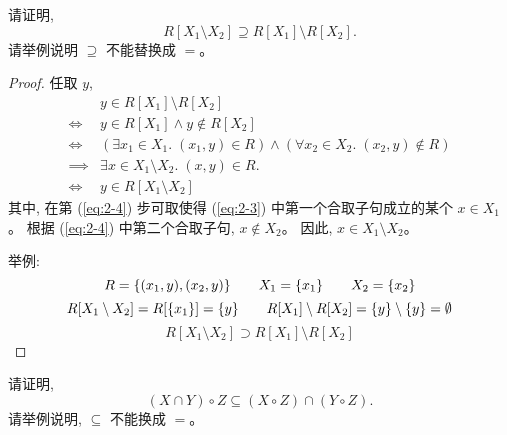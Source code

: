\documentclass[a4paper, justified]{tufte-handout}
\begin{document}
\begin{problem}
  请证明,
  \[
    R[X_1 \setminus X_2] \supseteq R[X_1] \setminus R[X_2].
  \]
  请举例说明 $\supseteq$ 不能替换成 $=$。
\end{problem}

\begin{proof}
  任取 $y$,
  \setcounter{equation}{0}
  \begin{align}
    & y \in R[X_{1}] \setminus R[X_{2}] \\[6pt]
    \iff & y \in R[X_{1}] \land y \notin R[X_{2}] \\[6pt]
    \iff & (\exists x_{1} \in X_{1}.\; (x_{1}, y) \in R)
      \land (\forall x_{2} \in X_{2}.\; (x_{2}, y) \notin R)
      \label{eq:2-3} \\[6pt]
    \implies & \exists x \in X_{1} \setminus X_{2}.\; (x, y) \in R. \\[6pt]
      \label{eq:2-4}
    \iff & y \in R[X_{1} \setminus X_{2}]
  \end{align}
  其中, 在第 (\ref{eq:2-4}) 步可取使得 (\ref{eq:2-3})
  中第一个合取子句成立的某个 $x \in X_{1}$。
  根据 (\ref{eq:2-4}) 中第二个合取子句, $x \notin X_{2}$。
  因此, $x \in X_{1} \setminus X_{2}$。

  举例:
  \[
    R = \{(x_{1}, y), (x_{2}, y)\}
    \qquad X_{1} = \{x_{1}\}
    \qquad X_{2} = \{x_{2}\}
  \]
  \[
    R[X_{1} \setminus X_{2}] = R[\{x_{1}\}] = \{y\}
    \qquad R[X_{1}] \setminus R[X_{2}] = \{y\} \setminus \{y\} = \emptyset
  \]
  \[
    R[X_1 \setminus X_2] \supset R[X_1] \setminus R[X_2]
  \]
\end{proof}

\begin{problem}
  请证明,
  \[
    (X \cap Y) \circ Z \subseteq (X \circ Z) \cap (Y \circ Z).
  \]
  请举例说明, $\subseteq$ 不能换成 $=$。
\end{problem}
\end{document}
